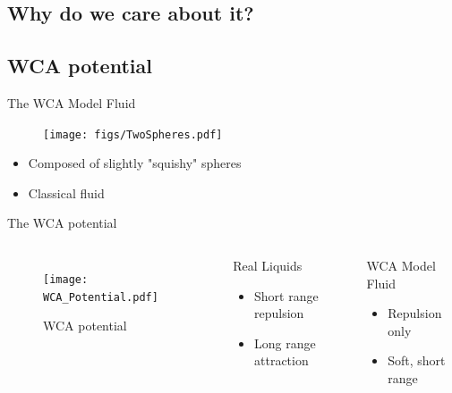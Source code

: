 \documentclass{beamer}
\begin{document}
\subsection*{Why do we care about it?}
\subsection*{WCA potential}

\begin{frame}{The WCA Model Fluid}
    \begin{figure}
        \centering
        \texttt{[image: figs/TwoSpheres.pdf]} 
        \label{fig:TwoSpheres}
    \end{figure} 
    
    \begin{itemize}
		\item Composed of slightly "squishy" spheres
		\item Classical fluid
	\end{itemize}
\end{frame}    

\begin{frame}{The WCA potential}
	\begin{columns}[t]
        \begin{figure}
            \centering
            \texttt{[image: WCA\_Potential.pdf]}
            \caption{WCA potential}
            \label{fig:WCA_potential}
          \end{figure}
		\begin{block}{Real Liquids}
			\begin{itemize}
				\item Short range repulsion 
				\item Long range attraction 
			\end{itemize}
		\end{block}
		\begin{block}{WCA Model Fluid}
			\begin{itemize}
				\item Repulsion only
				\item Soft, short range
			\end{itemize}
		\end{block}
	\end{columns}	
\end{frame}
\end{document}
